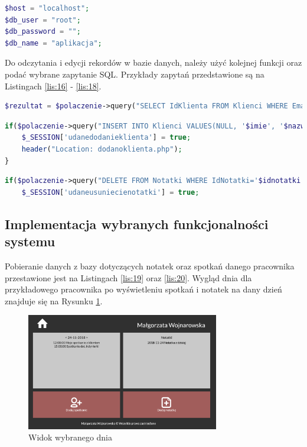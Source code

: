\documentclass[eng,printmode,openany,oneside]{mgr}
\begin{document}
	
	
	
\begin{lstlisting}[caption={Wnętrze pliku 'connect.php'}, language=PHP, label={lis:15}]
$host = "localhost";
$db_user = "root";
$db_password = "";
$db_name = "aplikacja";
\end{lstlisting}

	
	

Do odczytania i edycji rekordów w bazie danych, należy użyć kolejnej funkcji oraz podać wybrane zapytanie SQL. Przykłady zapytań przedstawione są na Listingach \ref{lis:16} - \ref{lis:18}.


\begin{lstlisting}[caption={Wybranie klientów o danym adresie e-mail (zapytanie SQL)}, language=PHP, label={lis:16}]
$rezultat = $polaczenie->query("SELECT IdKlienta FROM Klienci WHERE Email='$email'");
\end{lstlisting}

	
\begin{lstlisting}[caption={Dodanie klienta do bazy danych (zapytanie SQL)}, language=PHP, label={lis:17}]
if($polaczenie->query("INSERT INTO Klienci VALUES(NULL, '$imie', '$nazwisko', '$firma', '$email')")){
	$_SESSION['udanedodanieklienta'] = true;
	header("Location: dodanoklienta.php");
}
\end{lstlisting}
	
	
\begin{lstlisting}[caption={Usunięcie wybranej notatki (zapytanie SQL)}, language=PHP, label={lis:18}]
if($polaczenie->query("DELETE FROM Notatki WHERE IdNotatki='$idnotatki' "))
	$_SESSION['udaneusuniecienotatki'] = true;
\end{lstlisting}

	
	


\subsection{Implementacja wybranych funkcjonalności systemu}

Pobieranie danych z bazy dotyczących notatek oraz spotkań danego pracownika przestawione jest na Listingach \ref{lis:19} oraz \ref{lis:20}. Wygląd dnia dla przykładowego pracownika po wyświetleniu spotkań i notatek na dany dzień znajduje się na Rysunku \ref{fig:24}.

	\begin{figure}[H]
		\centering
		\includegraphics[width=0.75\textwidth]{day}
		\caption{Widok wybranego dnia}
		\label{fig:24}
	\end{figure}
	
\end{document}
